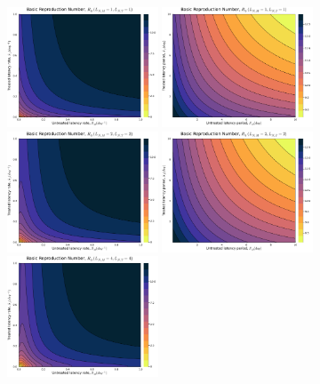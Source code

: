 \documentclass[11pt]{article}
\begin{document}
\begin{figure}[H]
  \centering
  \includegraphics[width=0.4\textwidth]{../../fig/R0_rates_SMxST_1x1_uncal.pdf}
  \includegraphics[width=0.4\textwidth]{../../fig/R0_periods_SMxST_1x1_uncal.pdf}\\
  \includegraphics[width=0.4\textwidth]{../../fig/R0_rates_SMxST_2x2_uncal.pdf}
  \includegraphics[width=0.4\textwidth]{../../fig/R0_periods_SMxST_2x2_uncal.pdf}\\
  \includegraphics[width=0.4\textwidth]{../../fig/R0_rates_SMxST_4x4_uncal.pdf}

\end{figure}
\end{document}

